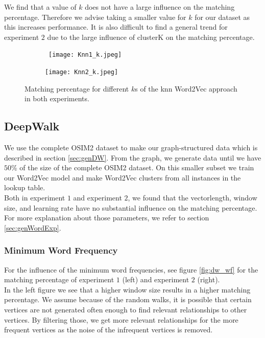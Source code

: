 We find that a value of $k$ does not have a large influence on the matching percentage. Therefore we advise taking a smaller value for $k$ for our dataset as this increases performance. It is also difficult to find a general trend for experiment $2$ due to the large influence of clusterK on the matching percentage.

\begin{figure}[!htb]
	\centering
	\begin{subfigure}[b]{.49\textwidth}\
		\texttt{[image: Knn1\_k.jpeg]}
	\end{subfigure}
	\begin{subfigure}[b]{.49\textwidth}
		\texttt{[image: Knn2\_k.jpeg]}
	\end{subfigure}
	\caption{Matching percentage for different $k$s of the knn Word2Vec approach in both experiments.}
	\label{fig:knn_k}
\end{figure}

\subsection{DeepWalk}

We use the complete OSIM2 dataset to make our graph-structured data which is described in section \ref{sec:genDW}. From the graph, we generate data until we have $50$\% of the size of the complete OSIM2 dataset. On this smaller subset we train our Word2Vec model and make Word2Vec clusters from all instances in the lookup table. \\
Both in experiment $1$ and experiment $2$, we found that the vectorlength, window size, and learning rate have no substantial influence on the matching percentage. For more explanation about those parameters, we refer to section \ref{sec:genWordExp}.

\subsubsection{Minimum Word Frequency}

For the influence of the minimum word frequencies, see figure \ref{fig:dw_wf} for the matching percentage of experiment $1$ (left) and experiment $2$ (right). \\

In the left figure we see that a higher window size results in a higher matching percentage. We assume because of the random walks, it is possible that certain vertices are not generated often enough to find relevant relationships to other vertices. By filtering those, we get more relevant relationships for the more frequent vertices as the noise of the infrequent vertices is removed. \\

